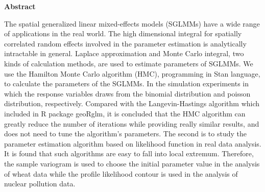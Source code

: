 \begin{center}
{\bf \Large Abstract}\\
\vskip 0.6cm
\end{center}
\par

The spatial generalized linear mixed-effects models (SGLMMs) have a wide range of applications in the real world. The high dimensional integral for spatially correlated random effects involved in the parameter estimation is analytically intractable in general. Laplace approximation and Monte Carlo integral, two kinds of calculation methods, are used to estimate parameters of SGLMMs. We use the Hamilton Monte Carlo algorithm (HMC), programming in Stan language, to calculate the parameters of the SGLMMs. In the simulation experiments in which the response variables draws from the binomial distribution and poisson distribution, respectively. Compared with the Langevin-Hastings algorithm which included in R package geoRglm, it is concluded that the HMC algorithm can greatly reduce the number of iterations while providing really similar results, and does not need to tune the algorithm's parameters. The second is to study the parameter estimation algorithm based on likelihood function in real data analysis. It is found that such algorithms are easy to fall into local extremum. Therefore, the sample variogram is used to choose the initial parameter value in the analysis of wheat data while the profile likelihood contour is used in the analysis of nuclear pollution data.



%  




